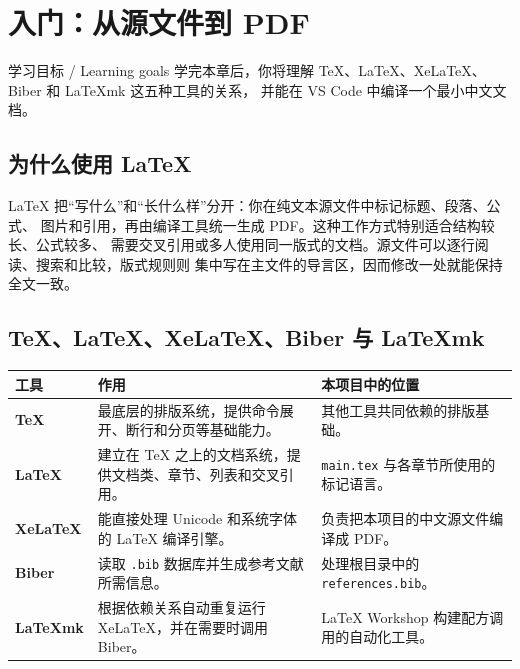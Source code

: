 %
\section{入门：从源文件到 PDF}

\begin{learningbox}{学习目标 / Learning goals}
学完本章后，你将理解 TeX、LaTeX、XeLaTeX、Biber 和 LaTeXmk 这五种工具的关系，
并能在 VS Code 中编译一个最小中文文档。
\end{learningbox}

\subsection{为什么使用 LaTeX}

LaTeX 把“写什么”和“长什么样”分开：你在纯文本源文件中标记标题、段落、公式、
图片和引用，再由编译工具统一生成 PDF。这种工作方式特别适合结构较长、公式较多、
需要交叉引用或多人使用同一版式的文档。源文件可以逐行阅读、搜索和比较，版式规则则
集中写在主文件的导言区，因而修改一处就能保持全文一致。

\subsection{TeX、LaTeX、XeLaTeX、Biber 与 LaTeXmk}

\noindent\begin{tabularx}{\textwidth}{>{\bfseries}l X X}
\toprule
工具 & 作用 & 本项目中的位置 \\
\midrule
TeX & 最底层的排版系统，提供命令展开、断行和分页等基础能力。 & 其他工具共同依赖的排版基础。 \\
LaTeX & 建立在 TeX 之上的文档系统，提供文档类、章节、列表和交叉引用。 & \texttt{main.tex} 与各章节所使用的标记语言。 \\
XeLaTeX & 能直接处理 Unicode 和系统字体的 LaTeX 编译引擎。 & 负责把本项目的中文源文件编译成 PDF。 \\
Biber & 读取 \texttt{.bib} 数据库并生成参考文献所需信息。 & 处理根目录中的 \texttt{references.bib}。 \\
LaTeXmk & 根据依赖关系自动重复运行 XeLaTeX，并在需要时调用 Biber。 & LaTeX Workshop 构建配方调用的自动化工具。 \\
\bottomrule
\end{tabularx}

